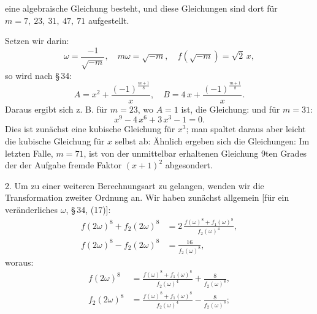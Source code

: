 eine algebraische Gleichung besteht, und diese Gleichungen sind dort
für $m=7,\ 23,\ 31,\ 47,\ 71$ aufgestellt.

Setzen wir darin:
\[
\omega=\frac{-1}{\sqrt{-m}},\quad m\omega=\sqrt{-m},\quad f(\sqrt{-m})=\sqrt2\,x,
\]
so wird nach \S\,34:
\[
A=x^2+\frac{(-1)^{\frac{m+1}{8}}}{x},\quad B=4\,x+\frac{(-1)^{\frac{m+1}{8}}}{x}.
\]
Daraus ergibt sich z. B. für $m=23$, wo $A=1$ ist, die Gleichung:
und für $m=31$:
\[
x^9-4\,x^6+3\,x^3-1=0.
\]
Dies ist zunächst eine kubische Gleichung für $x^3$; man spaltet daraus
aber leicht die kubische Gleichung für $x$ selbst ab:
Ähnlich ergeben sich die Gleichungen:
Im letzten Falle, $m=71$, ist von der unmittelbar erhaltenen Gleichung
9ten Grades der der Aufgabe fremde Faktor $(x+1)^2$ abgesondert.

2. Um zu einer weiteren Berechnungsart zu gelangen, wenden wir die
Transformation zweiter Ordnung an. Wir haben zunächst allgemein
[für ein veränderliches $\omega$, \S\,34, (17)]:
\[
\begin{aligned}
f(2\omega)^8+f_2(2\omega)^8&=2\,\frac{f(\omega)^8+f_1(\omega)^8}{f_2(\omega)^4},\\
f(2\omega)^8-f_2(2\omega)^8&=\frac{16}{f_2(\omega)^8},
\end{aligned}
\]
woraus:
\[
\begin{aligned}
f(2\omega)^8&=\frac{f(\omega)^8+f_1(\omega)^8}{f_2(\omega)^4}+\frac{8}{f_2(\omega)^8},\\
f_2(2\omega)^8&=\frac{f(\omega)^8+f_1(\omega)^8}{f_2(\omega)^4}-\frac{8}{f_2(\omega)^8};
\end{aligned}
\]
